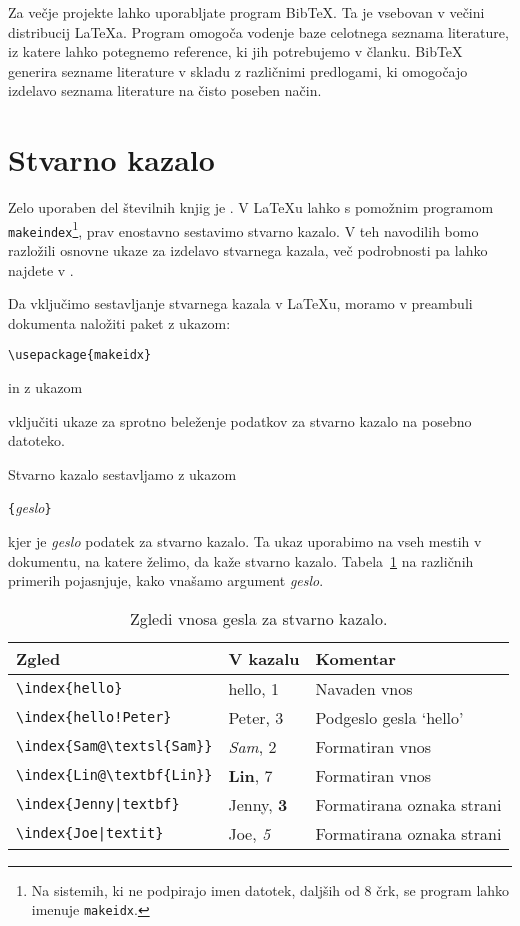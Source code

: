 Za večje projekte lahko uporabljate program Bib\TeX{}. Ta je vsebovan v večini
distribucij \LaTeX{}a. Program omogoča vodenje baze celotnega seznama
literature, iz katere lahko potegnemo reference, ki jih potrebujemo 
v članku. Bib\TeX{} generira sezname literature v skladu z 
različnimi predlogami, ki omogočajo izdelavo seznama literature 
na čisto poseben način.

\section{Stvarno kazalo} \label{sec:indexing}
Zelo uporaben del številnih knjig je . V \LaTeX{}u
lahko s pomožnim programom \texttt{makeindex}\footnote{Na sistemih, ki ne podpirajo imen datotek,
  daljših od 8 črk, se program lahko imenuje \texttt{makeidx}.}, prav enostavno sestavimo 
  stvarno kazalo. V teh navodilih bomo razložili osnovne ukaze za izdelavo stvarnega kazala,
   več podrobnosti pa lahko najdete v \companion.   

Da vključimo sestavljanje stvarnega kazala v \LaTeX{}u, moramo v preambuli dokumenta
naložiti paket  z ukazom:
\begin{lscommand}
\verb|\usepackage{makeidx}|
\end{lscommand}
\noindent in z ukazom 
\begin{lscommand}
\end{lscommand}
\noindent vključiti ukaze za sprotno beleženje podatkov za stvarno kazalo na posebno datoteko.

Stvarno kazalo sestavljamo z ukazom 
\begin{lscommand}
  \verb|{|\emph{geslo}\verb|}|
\end{lscommand}
\noindent kjer je \emph{geslo} podatek za stvarno kazalo. Ta ukaz uporabimo na vseh mestih 
v dokumentu, na katere želimo, da kaže stvarno kazalo.  Tabela~\ref{index} na različnih primerih
pojasnjuje, kako vnašamo argument \emph{geslo}.

\begin{table}[!tp]
\caption{Zgledi vnosa gesla za stvarno kazalo.}
\label{index}
\begin{center}
\begin{tabular}{@{}lll@{}}
  \textbf{Zgled} &\textbf{V kazalu} &\textbf{Komentar}\\\hline
  \rule{0pt}{1.05em}\verb|\index{hello}| &hello, 1 &Navaden vnos\\ 
\verb|\index{hello!Peter}|   &\hspace*{2ex}Peter, 3 &Podgeslo gesla `hello'\\ 
\verb|\index{Sam@\textsl{Sam}}|     &\textsl{Sam}, 2& Formatiran vnos\\ 
\verb|\index{Lin@\textbf{Lin}}|     &\textbf{Lin}, 7&  Formatiran vnos\\ 
\verb.\index{Jenny|textbf}.     &Jenny, \textbf{3}&  Formatirana oznaka strani\\
\verb.\index{Joe|textit}.     &Joe, \textit{5}& Formatirana oznaka strani
\end{tabular}
\end{center}
\end{table}


